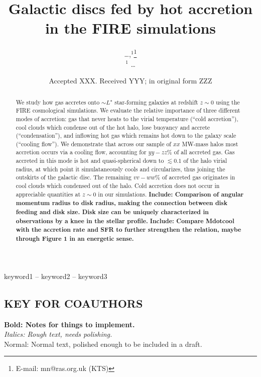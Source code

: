 \documentclass[fleqn,usenatbib]{mnras}
\title[Hot Accretion in FIRE]{Galactic discs fed by hot accretion in the FIRE simulations}
\author[\ldots]{
\ldots,$^{1}$\thanks{E-mail: mn@ras.org.uk (KTS)}
\\
$^1$ \ldots
}
\date{Accepted XXX. Received YYY; in original form ZZZ}
\begin{document}
\label{firstpage}
\pagerange{\pageref{firstpage}--\pageref{lastpage}}
\maketitle

\begin{abstract}
We study how gas accretes onto $\sim L^\star$ star-forming galaxies at redshift $z\sim0$ using the FIRE cosmological simulations. We evaluate the relative importance of three different modes of accretion: 
gas that never heats to the virial temperature (``cold accretion''), 
cool clouds which condense out of the hot halo, lose buoyancy and accrete  (``condensation''), 
and inflowing hot gas which remains hot down to the galaxy scale (``cooling flow''). 
We demonstrate that across our sample of $xx$ MW-mass halos most accretion occurs via a cooling flow, accounting for $yy-zz\%$ of all accreted gas. Gas accreted in this mode is hot and quasi-spherical down to $\lesssim 0.1$ of the halo virial radius, at which point it simulataneously cools and circularizes, thus joining the outskirts of the galactic disc. 
The remaining $vv-ww\%$ of accreted gas originates in cool clouds which condensed out of the halo. Cold accretion does not occur in appreciable quantities at $z\sim0$ in our simulations.
\textbf{
Include: Comparison of angular momentum radius to disk radius, making the connection between disk feeding and disk size.
Disk size can be uniquely characterized in observations by a knee in the stellar profile.
}
\textbf{
Include: Compare Mdotcool with the accretion rate and SFR to further strengthen the relation, maybe through Figure 1 in an energetic sense.
}
\end{abstract}

\begin{keywords}
keyword1 -- keyword2 -- keyword3
\end{keywords}



\subsection{ KEY FOR COAUTHORS}
\textbf{Bold: Notes for things to implement.} \\
\textit{Italics: Rough text, needs polishing.} \\
Normal: Normal text, polished enough to be included in a draft.
\end{document}
